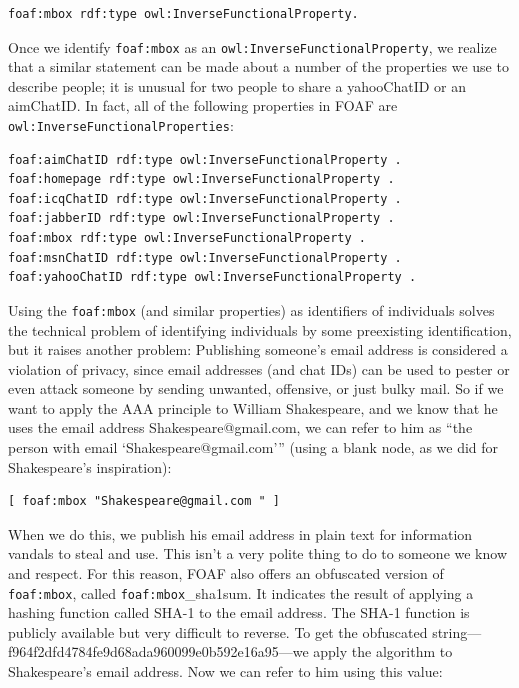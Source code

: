 \begin{lstlisting}
foaf:mbox rdf:type owl:InverseFunctionalProperty.
\end{lstlisting}

Once we identify \texttt{foaf:mbox} as an \texttt{owl:InverseFunctionalProperty}, we
realize that a similar statement can be made about a number of the
properties we use to describe people; it is unusual for two people to
share a yahooChatID or an aimChatID. In fact, all of the following
properties in FOAF are \texttt{owl:InverseFunctionalProperties}:

\begin{lstlisting}
foaf:aimChatID rdf:type owl:InverseFunctionalProperty . 
foaf:homepage rdf:type owl:InverseFunctionalProperty . 
foaf:icqChatID rdf:type owl:InverseFunctionalProperty . 
foaf:jabberID rdf:type owl:InverseFunctionalProperty . 
foaf:mbox rdf:type owl:InverseFunctionalProperty . 
foaf:msnChatID rdf:type owl:InverseFunctionalProperty .
foaf:yahooChatID rdf:type owl:InverseFunctionalProperty .
\end{lstlisting}

Using the \texttt{foaf:mbox} (and similar properties) as identifiers of
individuals solves the technical problem of identifying individuals by
some preexisting identification, but it raises another problem:
Publishing someone's email address is considered a violation of privacy,
since email addresses (and chat IDs) can be used to pester or even
attack someone by sending unwanted, offensive, or just bulky mail. So if
we want to apply the AAA principle to William Shakespeare, and we know
that he uses the email address
Shakespeare@gmail.com, we can refer
to him as ``the person with email `Shakespeare@gmail.com''' (using a
blank node, as we did for Shakespeare's inspiration):

\begin{lstlisting}
[ foaf:mbox "Shakespeare@gmail.com " ]
\end{lstlisting}

When we do this, we publish his email address in plain text for
information vandals to steal and use. This isn't a very polite thing to
do to someone we know and respect. For this reason, FOAF also offers an
obfuscated version of \texttt{foaf:mbox}, called \texttt{foaf:mbox}\_sha1sum. It indicates
the result of applying a hashing function called SHA-1 to the email
address. The SHA-1 function is publicly available but very difficult to
reverse. To get the obfuscated string---f964f2dfd4784fe9d68ada960099e0b592e16a95---we apply the algorithm to Shakespeare's email
address. Now we can refer to him using this value:

